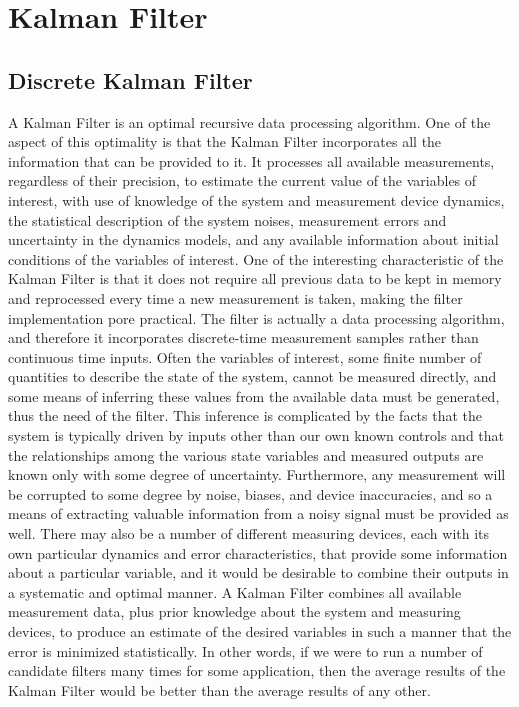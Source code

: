  
 \newcommand{\cursiva}[1]{\textit{#1}}
 
 
\chapter{Kalman Filter}
\label{ch:Kalman_Filter}

\section{Discrete Kalman Filter}

A Kalman Filter is an optimal recursive data processing algorithm. One of the aspect of this optimality is that the Kalman Filter incorporates all the information that can be provided to it. It processes all available measurements, regardless of their precision, to estimate the current value of the variables of interest, with use of knowledge of the system and measurement device dynamics, the statistical description of the system noises, measurement errors and uncertainty in the dynamics models, and any available information about initial conditions of the variables of interest. One of the interesting characteristic of the Kalman Filter is that it does not require all previous data to be kept in memory and reprocessed every time a new measurement is taken, making the filter implementation pore practical. The filter is actually a data processing algorithm, and therefore it incorporates discrete-time measurement samples rather than continuous time inputs. Often the variables of interest, some finite number of quantities to describe the state of the system, cannot be measured directly, and some means of inferring these values from the available data must be generated, thus the need of the filter. This inference is complicated by the facts that the system is typically driven by inputs other than our own known controls and that the relationships among the various state variables and measured outputs are known only with some degree of uncertainty. Furthermore, any measurement will be corrupted to some degree by noise, biases, and device inaccuracies, and so a means of extracting valuable information from a noisy signal must be provided as well. There may also be a number of different measuring devices, each with its own particular dynamics and error characteristics, that provide some information about a particular variable, and it would be desirable to combine their outputs in a systematic and optimal manner. A Kalman Filter combines all available measurement data, plus prior knowledge about the system and measuring devices, to produce an estimate of the desired variables in such a manner that the error is minimized statistically. In other words, if we were to run a number of candidate filters many times for some application, then the average results of the Kalman Filter would be better than the average results of any other. \cite{Maybeck1979}

